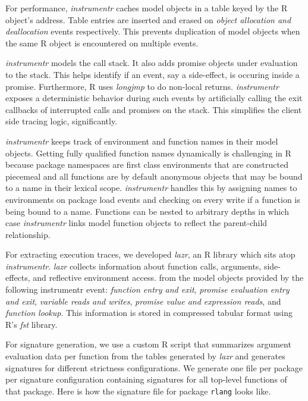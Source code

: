 \documentclass[screen,acmsmall]{acmart}
\newcommand{\code}[1]{\lstinline[style=R]|#1|\xspace}
\begin{document}
For performance, \emph{instrumentr} caches model objects in a table keyed by the
R object's address. Table entries are inserted and erased on \emph{object
  allocation and deallocation} events respectively. This prevents duplication of
model objects when the same R object is encountered on multiple events.

\emph{instrumentr} models the call stack. It also adds promise objects under
evaluation to the stack. This helps identify if an event, say a side-effect, is
occuring inside a promise. Furthermore, R uses \emph{longjmp} to do non-local
returns. \emph{instrumentr} exposes a deterministic behavior during such events
by artificially calling the exit callbacks of interrupted calls and promises on
the stack. This simplifies the client side tracing logic, significantly.

\emph{instrumentr} keeps track of environment and function names in their model
objects. Getting fully qualified function names dynamically is challenging in R
because package namespaces are first class environments that are constructed
piecemeal and all functions are by default anonymous objects that may be bound
to a name in their lexical scope. \emph{instrumentr} handles this by assigning
names to environments on package load events and checking on every write if a
function is being bound to a name. Functions can be nested to arbitrary depths
in which case \emph{instrumentr} links model function objects to reflect the
parent-child relationship.

For extracting execution traces, we developed \emph{lazr}, an R library which
sits atop \emph{instrumentr}. \emph{lazr} collects information about function
calls, arguments, side-effects, and reflective environment access. from the
model objects provided by the following instrumentr event: \emph{function entry
  and exit}, \emph{promise evaluation entry and exit}, \emph{variable reads and
  writes}, \emph{promise value and expression reads}, and \emph{function
  lookup}. This information is stored in compressed tabular format using R's
\emph{fst} library.

For signature generation, we use a custom R script that summarizes argument
evaluation data per function from the tables generated by \emph{lazr} and
generates signatures for different strictness configurations. We generate one
file per package per signature configuration containing signatures for all
top-level functions of that package. Here is how the signature file for package
\code{rlang} looks like.
\end{document}
